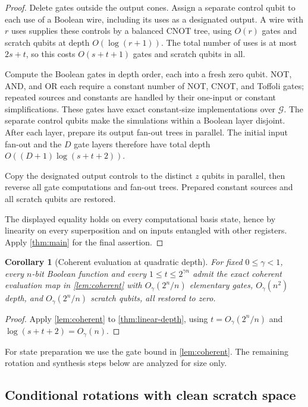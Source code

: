 \documentclass[11pt]{article}
\newtheorem{corollary}[corollary]{Corollary}
\begin{document}
\begin{proof}
Delete gates outside the output cones.  Assign a separate control qubit
to each use of a Boolean wire, including its uses as a designated output.
A wire with $r$ uses supplies these controls by a balanced CNOT tree,
using $O(r)$ gates and scratch qubits
at depth $O(\log(r+1))$.  The total number of uses is at most $2s+t$,
so this costs $O(s+t+1)$ gates and scratch qubits in all.

Compute the Boolean gates in depth order, each into a fresh zero qubit.
NOT, AND, and OR each require a constant number of NOT, CNOT, and
Toffoli gates; repeated sources and constants are handled by their
one-input or constant simplifications.  These gates have exact
constant-size implementations over $\mathcal G$.  The separate control
qubits make the simulations within a Boolean layer disjoint.  After
each layer, prepare its output fan-out trees in parallel.  The initial
input fan-out and the $D$ gate layers therefore have total depth
$O((D+1)\log(s+t+2))$.

Copy the designated output controls to the distinct $z$ qubits in
parallel, then reverse all gate computations and fan-out trees.
Prepared constant sources and all scratch qubits are restored.

The displayed equality holds on every computational basis state, hence
by linearity on every superposition and on inputs entangled with other
registers.  Apply \cref{thm:main} for the final assertion.
\end{proof}

\begin{corollary}[Coherent evaluation at quadratic depth]
\label{cor:coherent-depth}
For fixed $0\le\gamma<1$, every $n$-bit Boolean function and every
$1\le t\le2^{\gamma n}$ admit the exact coherent evaluation map in
\cref{lem:coherent} with $O_\gamma(2^n/n)$ elementary gates,
$O_\gamma(n^2)$ depth, and $O_\gamma(2^n/n)$ scratch qubits, all restored
to zero.
\end{corollary}

\begin{proof}
Apply \cref{lem:coherent} to \cref{thm:linear-depth}, using
$t=O_\gamma(2^n/n)$ and $\log(s+t+2)=O_\gamma(n)$.
\end{proof}

For state preparation we use the gate bound in \cref{lem:coherent}.
The remaining rotation and synthesis steps below are analyzed for size only.

\subsection{Conditional rotations with clean scratch space}
\end{document}
